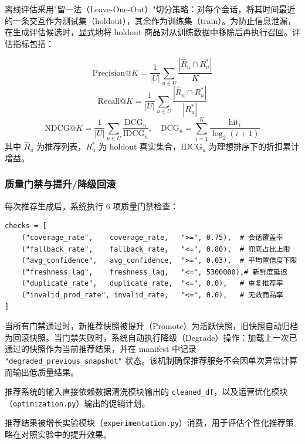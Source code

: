 离线评估采用"留一法（Leave-One-Out）"切分策略：对每个会话，将其时间最近的一条交互作为测试集（holdout），其余作为训练集（train）。为防止信息泄漏，在生成评估候选时，显式地将 holdout 商品对从训练数据中移除后再执行召回。评估指标包括：

\begin{equation}
    \text{Precision@}K = \frac{1}{|U|} \sum_{u \in U} \frac{|\hat{R}_u \cap R_u^*|}{K}
    \label{eq:precision-at-k}
\end{equation}
\begin{equation}
    \text{Recall@}K = \frac{1}{|U|} \sum_{u \in U} \frac{|\hat{R}_u \cap R_u^*|}{|R_u^*|}
    \label{eq:recall-at-k}
\end{equation}
\begin{equation}
    \text{NDCG@}K = \frac{1}{|U|} \sum_{u \in U} \frac{\text{DCG}_u}{\text{IDCG}_u}, \quad \text{DCG}_u = \sum_{i=1}^{K} \frac{\text{hit}_i}{\log_2(i + 1)}
    \label{eq:ndcg-at-k}
\end{equation}
其中 $\hat{R}_u$ 为推荐列表，$R_u^*$ 为 holdout 真实集合，$\text{IDCG}_u$ 为理想排序下的折扣累计增益。

\subsubsection{质量门禁与提升/降级回滚}

每次推荐生成后，系统执行 6 项质量门禁检查：

\begin{lstlisting}[style=codexcode]
checks = [
    ("coverage_rate",    coverage_rate,   ">=", 0.75),  # 会话覆盖率
    ("fallback_rate",    fallback_rate,   "<=", 0.80),  # 兜底占比上限
    ("avg_confidence",   avg_confidence,  ">=", 0.03),  # 平均置信度下限
    ("freshness_lag",    freshness_lag,   "<=", 5300000),# 新鲜度延迟
    ("duplicate_rate",   duplicate_rate,  "<=", 0.0),   # 重复推荐率
    ("invalid_prod_rate", invalid_rate,   "<=", 0.0),   # 无效商品率
]
\end{lstlisting}

当所有门禁通过时，新推荐快照被提升（Promote）为活跃快照，旧快照自动归档为回滚快照。当门禁失败时，系统自动执行降级（Degrade）操作：加载上一次已通过的快照作为当前推荐结果，并在 manifest 中记录 \texttt{"degraded\_previous\_snapshot"} 状态。该机制确保推荐服务不会因单次异常计算而输出低质量结果。

推荐系统的输入直接依赖数据清洗模块输出的 \texttt{cleaned\_df}，以及运营优化模块（\texttt{optimization.py}）输出的促销计划。

推荐结果被增长实验模块（\texttt{experimentation.py}）消费，用于评估个性化推荐策略在对照实验中的提升效果。

